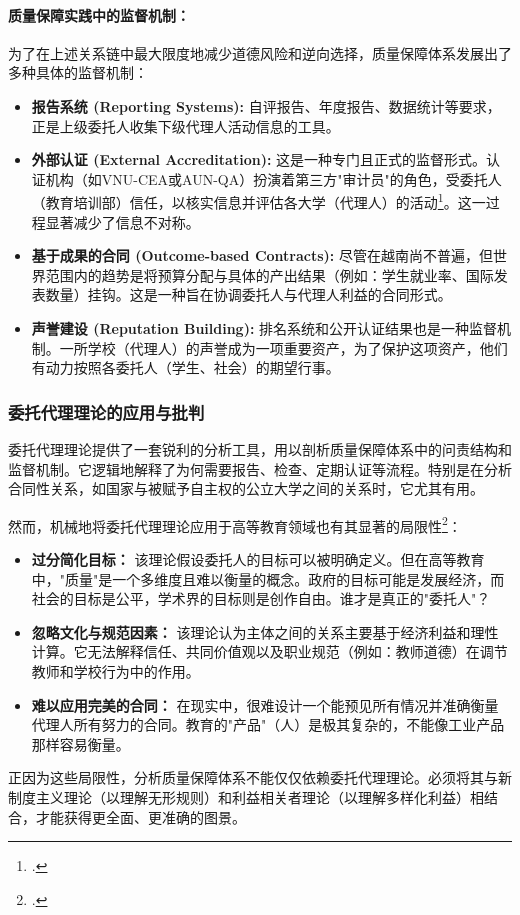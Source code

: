\paragraph{质量保障实践中的监督机制：}
为了在上述关系链中最大限度地减少道德风险和逆向选择，质量保障体系发展出了多种具体的监督机制：
\begin{itemize}
    \item \textbf{报告系统 (Reporting Systems):} 自评报告、年度报告、数据统计等要求，正是上级委托人收集下级代理人活动信息的工具。
    \item \textbf{外部认证 (External Accreditation):} 这是一种专门且正式的监督形式。认证机构（如VNU-CEA或AUN-QA）扮演着第三方"审计员"的角色，受委托人（教育培训部）信任，以核实信息并评估各大学（代理人）的活动\footcite{Borgos2013}。这一过程显著减少了信息不对称。
    \item \textbf{基于成果的合同 (Outcome-based Contracts):} 尽管在越南尚不普遍，但世界范围内的趋势是将预算分配与具体的产出结果（例如：学生就业率、国际发表数量）挂钩。这是一种旨在协调委托人与代理人利益的合同形式。
    \item \textbf{声誉建设 (Reputation Building):} 排名系统和公开认证结果也是一种监督机制。一所学校（代理人）的声誉成为一项重要资产，为了保护这项资产，他们有动力按照各委托人（学生、社会）的期望行事。
\end{itemize}

\subsubsection{委托代理理论的应用与批判}

委托代理理论提供了一套锐利的分析工具，用以剖析质量保障体系中的问责结构和监督机制。它逻辑地解释了为何需要报告、检查、定期认证等流程。特别是在分析合同性关系，如国家与被赋予自主权的公立大学之间的关系时，它尤其有用。

然而，机械地将委托代理理论应用于高等教育领域也有其显著的局限性\footcite{RIHE2022}：
\begin{itemize}
    \item \textbf{过分简化目标：} 该理论假设委托人的目标可以被明确定义。但在高等教育中，"质量"是一个多维度且难以衡量的概念。政府的目标可能是发展经济，而社会的目标是公平，学术界的目标则是创作自由。谁才是真正的"委托人"？
    \item \textbf{忽略文化与规范因素：} 该理论认为主体之间的关系主要基于经济利益和理性计算。它无法解释信任、共同价值观以及职业规范（例如：教师道德）在调节教师和学校行为中的作用。
    \item \textbf{难以应用完美的合同：} 在现实中，很难设计一个能预见所有情况并准确衡量代理人所有努力的合同。教育的"产品"（人）是极其复杂的，不能像工业产品那样容易衡量。
\end{itemize}
正因为这些局限性，分析质量保障体系不能仅仅依赖委托代理理论。必须将其与新制度主义理论（以理解无形规则）和利益相关者理论（以理解多样化利益）相结合，才能获得更全面、更准确的图景。

